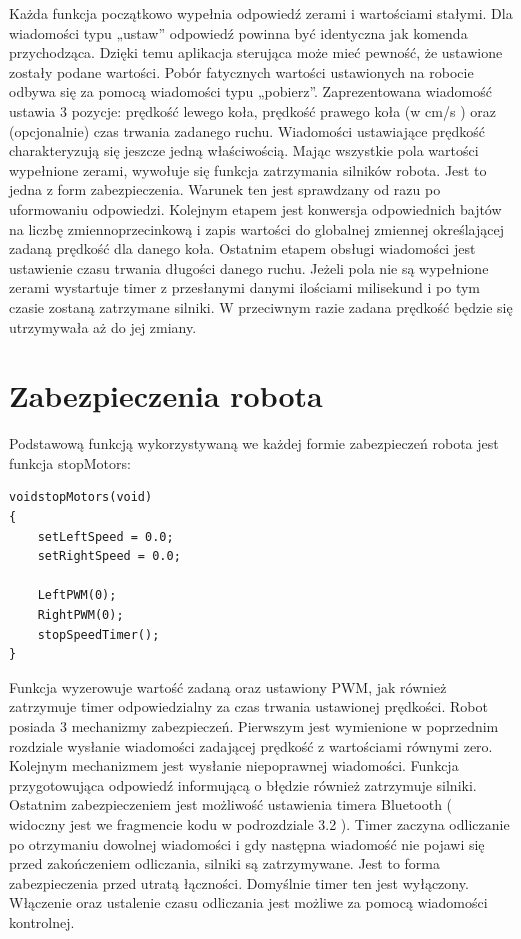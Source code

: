 \documentclass[eng,printmode]{mgr}
\begin{document}
Każda funkcja początkowo wypełnia odpowiedź zerami i wartościami stałymi. Dla wiadomości typu „ustaw” odpowiedź powinna być identyczna jak komenda przychodząca. Dzięki temu aplikacja sterująca może mieć pewność, że ustawione zostały podane wartości. Pobór fatycznych wartości ustawionych na robocie odbywa się za pomocą wiadomości typu „pobierz”.  Zaprezentowana wiadomość ustawia 3 pozycje: prędkość lewego koła, prędkość prawego koła (w cm/s ) oraz (opcjonalnie) czas trwania zadanego ruchu. Wiadomości ustawiające prędkość charakteryzują się jeszcze jedną właściwością. Mając wszystkie pola wartości  wypełnione zerami, wywołuje się funkcja zatrzymania silników robota. Jest to jedna z form zabezpieczenia. Warunek ten jest sprawdzany od razu po uformowaniu odpowiedzi. Kolejnym etapem jest konwersja odpowiednich bajtów na liczbę zmiennoprzecinkową i zapis wartości do globalnej zmiennej określającej zadaną prędkość dla danego koła. Ostatnim etapem obsługi wiadomości jest ustawienie czasu trwania długości danego ruchu. Jeżeli pola nie są wypełnione zerami wystartuje timer z przesłanymi danymi ilościami milisekund i po tym czasie zostaną zatrzymane silniki. W przeciwnym razie zadana prędkość będzie się utrzymywała aż do jej zmiany.

 \section{Zabezpieczenia robota}

Podstawową funkcją wykorzystywaną we każdej formie zabezpieczeń robota jest funkcja stopMotors:
\begin{lstlisting}[style=c]
voidstopMotors(void)
{
	setLeftSpeed = 0.0;
	setRightSpeed = 0.0;

	LeftPWM(0);
	RightPWM(0);
	stopSpeedTimer();
}
\end{lstlisting}
Funkcja wyzerowuje wartość zadaną oraz ustawiony PWM, jak również zatrzymuje timer odpowiedzialny za czas trwania ustawionej prędkości. Robot posiada 3 mechanizmy zabezpieczeń. Pierwszym jest wymienione w poprzednim rozdziale wysłanie wiadomości zadającej prędkość z wartościami równymi zero. Kolejnym mechanizmem jest wysłanie niepoprawnej wiadomości. Funkcja przygotowująca odpowiedź informującą o błędzie również zatrzymuje silniki. Ostatnim zabezpieczeniem jest możliwość ustawienia timera Bluetooth ( widoczny jest we fragmencie kodu w podrozdziale 3.2 ). Timer zaczyna odliczanie po otrzymaniu dowolnej wiadomości i gdy następna wiadomość nie pojawi się przed zakończeniem odliczania, silniki są zatrzymywane. Jest to forma zabezpieczenia przed utratą łączności. Domyślnie timer ten jest wyłączony. Włączenie oraz ustalenie czasu odliczania jest możliwe za pomocą wiadomości kontrolnej.
\end{document}
